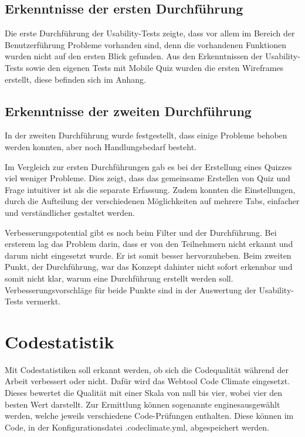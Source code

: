 \subsection{Erkenntnisse der ersten Durchführung}
Die erste Durchführung der \gls{Usability-Test}s zeigte, dass vor allem im Bereich der Benutzerführung Probleme vorhanden sind, denn die vorhandenen Funktionen wurden nicht auf den ersten Blick gefunden.
Aus den Erkenntnissen der Usability-Tests sowie den eigenen Tests mit Mobile Quiz wurden die ersten \gls{Wireframes} erstellt, diese befinden sich im Anhang.

\subsection{Erkenntnisse der zweiten Durchführung}
In der zweiten Durchführung wurde festgestellt, dass einige Probleme behoben werden konnten, aber noch Handlungsbedarf besteht.

Im Vergleich zur ersten Durchführungen gab es bei der Erstellung eines Quizzes viel weniger Probleme. Dies zeigt, dass das gemeinsame Erstellen von Quiz und Frage intuitiver ist als die separate Erfassung. Zudem konnten die Einstellungen, durch die Aufteilung der verschiedenen Möglichkeiten auf mehrere Tabs, einfacher und verständlicher gestaltet werden.

Verbesserungspotential gibt es noch beim Filter und der Durchführung. Bei ersterem lag das Problem darin, dass er von den Teilnehmern nicht erkannt und darum nicht eingesetzt wurde. Er ist somit besser hervorzuheben. Beim zweiten Punkt, der Durchführung, war das Konzept dahinter nicht sofort erkennbar und somit nicht klar, warum eine Durchführung erstellt werden soll. Verbesserungsvorschläge für beide Punkte sind in der Auswertung der Usability-Tests vermerkt.





\newpage
\section{Codestatistik}
Mit Codestatistiken soll erkannt werden, ob sich die Codequalität während der Arbeit verbessert oder nicht. Dafür wird das Webtool Code Climate \cite{codeclimate.com} eingesetzt. Dieses bewertet die Qualität mit einer Skala von null bis vier, wobei vier den besten Wert darstellt. Zur Ermittlung können sogenannte \glqq engines\grqq ausgewählt werden, welche jeweils verschiedene Code-Prüfungen enthalten. Diese können im Code, in der Konfigurationsdatei \glqq .codeclimate.yml\grqq, abgespeichert werden.\\

